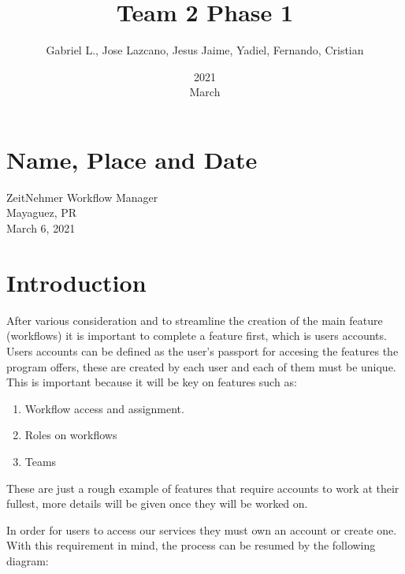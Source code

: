 \documentclass{article}
\title{Team 2 Phase 1}
\date{2021 \\ March}
\author{Gabriel L., Jose Lazcano, Jesus Jaime, Yadiel, Fernando, Cristian}
\begin{document}
\maketitle
\section{Name, Place and Date}
ZeitNehmer Workflow Manager\\
Mayaguez, PR\\
March 6, 2021
\section{Introduction}
After various consideration and to streamline the creation of the main feature (workflows) it is important to complete a feature first, which is users accounts. Users accounts can be defined as the user's passport for accesing the features the program offers, these are created by each user and each of them must be unique. This is important because it will be key on features such as:
\begin{enumerate}
  \item Workflow access and assignment.
  \item Roles on workflows
  \item Teams
\end{enumerate}
These are just a rough example of features that require accounts to work at their fullest, more details will be given once they will be worked on.
\vspace{10}

In order for users to access our services they must own an account or create one. With this requirement in mind, the process can be resumed by the following diagram:
\end{document}
